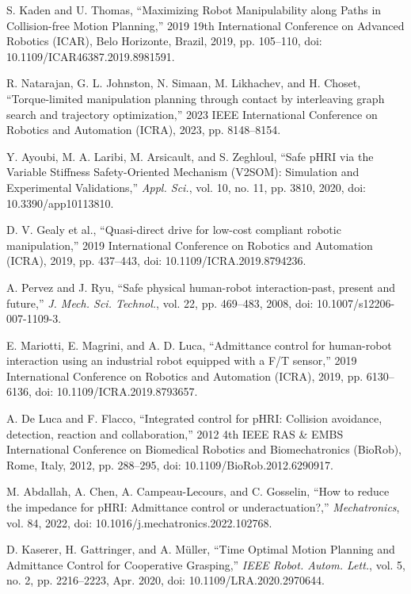 \documentclass[conference]{IEEEtran}
\begin{document}
\begin{thebibliography}{00}
     S. Kaden and U. Thomas, ``Maximizing Robot Manipulability along Paths in Collision-free Motion Planning,'' 2019 19th International Conference on Advanced Robotics (ICAR), Belo Horizonte, Brazil, 2019, pp. 105--110, doi: 10.1109/ICAR46387.2019.8981591.
    
     R. Natarajan, G. L. Johnston, N. Simaan, M. Likhachev, and H. Choset, ``Torque-limited manipulation planning through contact by interleaving graph search and trajectory optimization,'' 2023 IEEE International Conference on Robotics and Automation (ICRA), 2023, pp. 8148--8154.
    
     Y. Ayoubi, M. A. Laribi, M. Arsicault, and S. Zeghloul, ``Safe pHRI via the Variable Stiffness Safety-Oriented Mechanism (V2SOM): Simulation and Experimental Validations,'' \textit{Appl. Sci.}, vol. 10, no. 11, pp. 3810, 2020, doi: 10.3390/app10113810.
    
     D. V. Gealy et al., ``Quasi-direct drive for low-cost compliant robotic manipulation,'' 2019 International Conference on Robotics and Automation (ICRA), 2019, pp. 437--443, doi: 10.1109/ICRA.2019.8794236.
    
     A. Pervez and J. Ryu, ``Safe physical human-robot interaction-past, present and future,'' \textit{J. Mech. Sci. Technol.}, vol. 22, pp. 469--483, 2008, doi: 10.1007/s12206-007-1109-3.
    
     E. Mariotti, E. Magrini, and A. D. Luca, ``Admittance control for human-robot interaction using an industrial robot equipped with a F/T sensor,'' 2019 International Conference on Robotics and Automation (ICRA), 2019, pp. 6130--6136, doi: 10.1109/ICRA.2019.8793657.
    
     A. De Luca and F. Flacco, ``Integrated control for pHRI: Collision avoidance, detection, reaction and collaboration,'' 2012 4th IEEE RAS & EMBS International Conference on Biomedical Robotics and Biomechatronics (BioRob), Rome, Italy, 2012, pp. 288--295, doi: 10.1109/BioRob.2012.6290917.
    
     M. Abdallah, A. Chen, A. Campeau-Lecours, and C. Gosselin, ``How to reduce the impedance for pHRI: Admittance control or underactuation?,'' \textit{Mechatronics}, vol. 84, 2022, doi: 10.1016/j.mechatronics.2022.102768.
    
     D. Kaserer, H. Gattringer, and A. Müller, ``Time Optimal Motion Planning and Admittance Control for Cooperative Grasping,'' \textit{IEEE Robot. Autom. Lett.}, vol. 5, no. 2, pp. 2216--2223, Apr. 2020, doi: 10.1109/LRA.2020.2970644.
    

\end{thebibliography}

\vspace{12pt}
\end{document}
